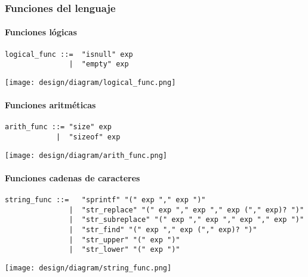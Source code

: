 \subsubsection{Funciones del lenguaje}
\paragraph{Funciones lógicas}
\begin{multicols}{2}
\begin{lstlisting}[style=nonumbers]      
logical_func ::=  "isnull" exp
               |  "empty" exp
\end{lstlisting}  
\columnbreak	
\begin{center}
\texttt{[image: design/diagram/logical\_func.png]} 
\end{center}
\end{multicols}

\paragraph{Funciones aritméticas}
\begin{multicols}{2}
\begin{lstlisting}[style=nonumbers]      
arith_func ::= "size" exp
            |  "sizeof" exp
\end{lstlisting}  
\columnbreak	
\begin{center}
\texttt{[image: design/diagram/arith\_func.png]} 
\end{center}
\end{multicols}
\pagebreak

\paragraph{Funciones cadenas de caracteres}
\begin{lstlisting}[style=nonumbers]      
string_func ::=   "sprintf" "(" exp "," exp ")"
               |  "str_replace" "(" exp "," exp "," exp ("," exp)? ")"
               |  "str_subreplace" "(" exp "," exp "," exp "," exp ")"
               |  "str_find" "(" exp "," exp ("," exp)? ")"
               |  "str_upper" "(" exp ")"
               |  "str_lower" "(" exp ")"
\end{lstlisting}  
\begin{center}
\texttt{[image: design/diagram/string\_func.png]} 
\end{center}

